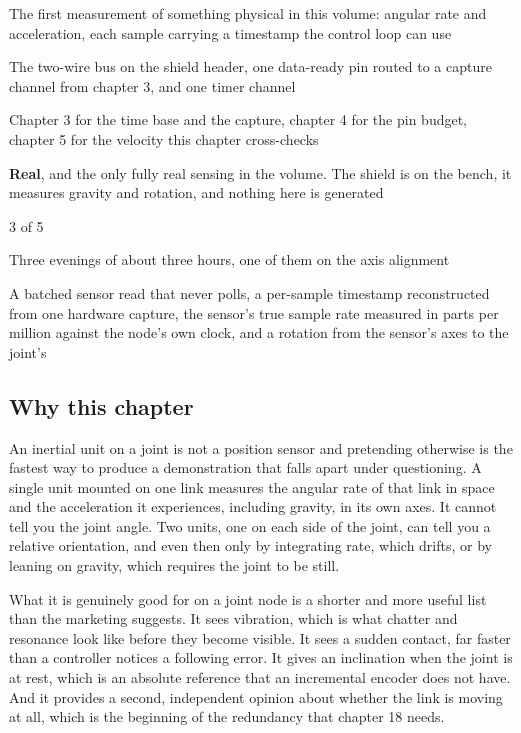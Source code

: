 
\begin{keyfacts}
\item[Adds to the node] The first measurement of something physical in this volume: angular rate and acceleration, each sample carrying a timestamp the control loop can use
\item[Peripherals] The two-wire bus on the shield header, one data-ready pin routed to a capture channel from chapter 3, and one timer channel
\item[Depends on] Chapter 3 for the time base and the capture, chapter 4 for the pin budget, chapter 5 for the velocity this chapter cross-checks
\item[Real or modelled] \textbf{Real}, and the only fully real sensing in the volume. The shield is on the bench, it measures gravity and rotation, and nothing here is generated
\item[Difficulty] 3 of 5
\item[Effort] Three evenings of about three hours, one of them on the axis alignment
\item[Deliverable] A batched sensor read that never polls, a per-sample timestamp reconstructed from one hardware capture, the sensor's true sample rate measured in parts per million against the node's own clock, and a rotation from the sensor's axes to the joint's
\end{keyfacts}

\subsection*{Why this chapter}

An inertial unit on a joint is not a position sensor and pretending otherwise is
the fastest way to produce a demonstration that falls apart under questioning. A
single unit mounted on one link measures the angular rate of that link in space
and the acceleration it experiences, including gravity, in its own axes. It
cannot tell you the joint angle. Two units, one on each side of the joint, can
tell you a relative orientation, and even then only by integrating rate, which
drifts, or by leaning on gravity, which requires the joint to be still.

What it is genuinely good for on a joint node is a shorter and more useful list
than the marketing suggests. It sees vibration, which is what chatter and
resonance look like before they become visible. It sees a sudden contact, far
faster than a controller notices a following error. It gives an inclination when
the joint is at rest, which is an absolute reference that an incremental encoder
does not have. And it provides a second, independent opinion about whether the
link is moving at all, which is the beginning of the redundancy that chapter 18
needs.

